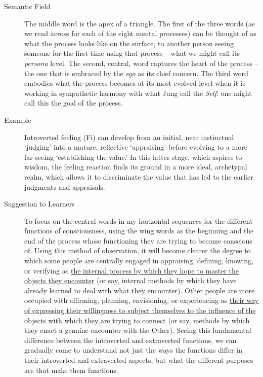 \begin{description}

\item[Semantic Field] The middle word is the apex of a triangle.  The first of
the three words (as we read across for each of the eight mental processes) can
be thought of as what the process looks like on the surface, to another person
seeing someone for the first time using that process -- what we might call its
\textit{persona} level.  The second, central, word captures the heart of the
process -- the one that is embraced by the \textit{ego} as its chief concern.
The third word embodies what the process becomes at its most evolved level when
it is working in sympathetic harmony with what Jung call the \textit{Self}: one
might call this the goal of the process.

\item[Example] Introverted feeling (Fi) can develop from an initial, near
instinctual `judging' into a mature, reflective `appraising' before evolving to
a more far-seeing `establishing the value.' In this latter stage, which aspires
to wisdom, the feeling reaction finds its ground in a more ideal, archetypal
realm, which allows it to discriminate the value that has led to the earlier
judgments and appraisals.

\item[Suggestion to Learners] To focus on the central words in my horizontal
sequences for the different functions of consciousness, using the wing words as
the beginning and the end of the process whose functioning they are trying to
become conscious of.  Using this method of observation, it will become clearer
the degree to which some people are centrally engaged in appraising, defining,
knowing, or verifying as \ul{the internal process by which they hope to master
the objects they encounter} (or say, internal methods by which they have
already learned to deal with what they encounter).  Other people are more
occupied with affirming, planning, envisioning, or experiencing as \ul{their
way of expressing their willingness to subject themselves to the influence of
the objects with which they are trying to connect} (or say, methods by which
they enact a genuine encounter with the Other).  Seeing this fundamental
difference between the introverted and extraverted functions, we can gradually
come to understand not just the ways the functions differ in their introverted
and extraverted aspects, but what the different purposes are that make them
functions.

\end{description}

